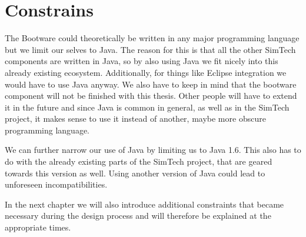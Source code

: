 \section{Constrains}

The Bootware could theoretically be written in any major programming language but we limit our selves to Java.
The reason for this is that all the other SimTech components are written in Java, so by also using Java we fit nicely into this already existing ecosystem.
Additionally, for things like Eclipse integration we would have to use Java anyway.
We also have to keep in mind that the bootware component will not be finished with this thesis.
Other people will have to extend it in the future and since Java is common in general, as well as in the SimTech project, it makes sense to use it instead of another, maybe more obscure programming language.

We can further narrow our use of Java by limiting us to Java 1.6.
This also has to do with the already existing parts of the SimTech project, that are geared towards this version as well.
Using another version of Java could lead to unforeseen incompatibilities.

In the next chapter we will also introduce additional constraints that became necessary during the design process and will therefore be explained at the appropriate times.
